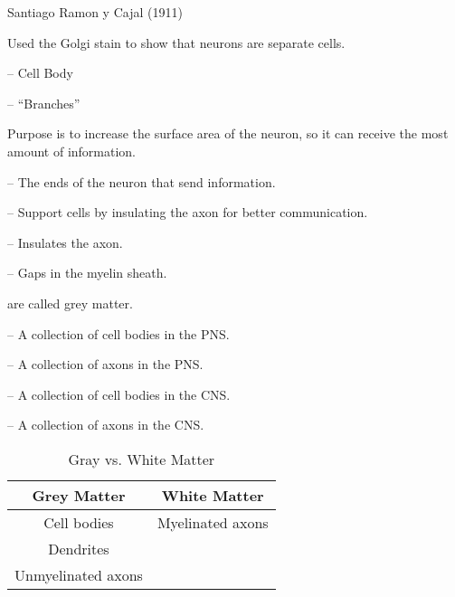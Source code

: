 \begin{coloredlist}
    \item Santiago Ramon y Cajal (1911)
    \begin{coloredlist}
        \item Used the Golgi stain to show that neurons are separate cells.
    \end{coloredlist}
    \item {} -- Cell Body
    \item {} -- ``Branches''
    \begin{coloredlist}
        \item Purpose is to increase the surface area of the neuron, so it can receive the most amount of information.
    \end{coloredlist}
    \item {} -- The ends of the neuron that send information.
    \item {} -- Support cells by insulating the axon for better communication.
    \item {} -- Insulates the axon.
    \item {} -- Gaps in the myelin sheath.
    \item {} are called grey matter.
    \item {} -- A collection of cell bodies in the PNS.
    \item {} -- A collection of axons in the PNS.
    \item {} -- A collection of cell bodies in the CNS.
    \item {} -- A collection of axons in the CNS.
\end{coloredlist}

\begin{table}[htbp]
    \centering
    \begin{tabular}{cc}
        \toprule
        \textbf{Grey Matter} & \textbf{White Matter} \\ \midrule
        Cell bodies          & Myelinated axons      \\
        Dendrites            &                       \\
        Unmyelinated axons   &                       \\
        \bottomrule
    \end{tabular}
    \caption{Gray vs. White Matter}\label{tab:}
\end{table}


